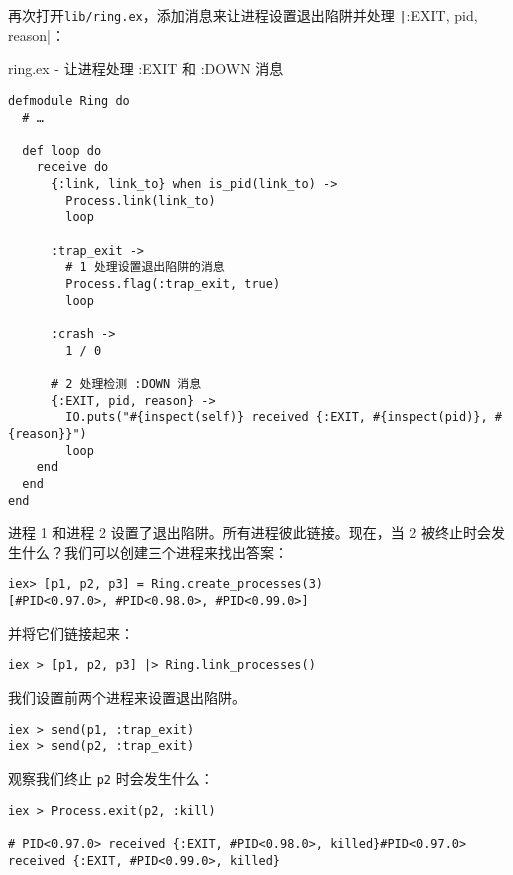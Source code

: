 再次打开\texttt{lib/ring.ex}，添加消息来让进程设置退出陷阱并处理
\texttt|{:EXIT, pid, reason}|：

\begin{code}{ring.ex - 让进程处理 :EXIT 和 :DOWN 消息}
\begin{verbatim}
defmodule Ring do
  # …

  def loop do
    receive do
      {:link, link_to} when is_pid(link_to) ->
        Process.link(link_to)
        loop

      :trap_exit ->
        # 1 处理设置退出陷阱的消息
        Process.flag(:trap_exit, true)
        loop

      :crash ->
        1 / 0

      # 2 处理检测 :DOWN 消息
      {:EXIT, pid, reason} ->
        IO.puts("#{inspect(self)} received {:EXIT, #{inspect(pid)}, #{reason}}")
        loop
    end
  end
end
\end{verbatim}
\label{lst:trap_exit_and_handle_exit_messages}
\end{code}

进程 1 和进程 2 设置了退出陷阱。所有进程彼此链接。现在，当 2 被终止时会发生什么？我们可以创建三个进程来找出答案：

\begin{code}{}
\begin{verbatim}
iex> [p1, p2, p3] = Ring.create_processes(3)
[#PID<0.97.0>, #PID<0.98.0>, #PID<0.99.0>]
\end{verbatim}
\end{code}

并将它们链接起来：

\begin{code}{}
\begin{verbatim}
iex > [p1, p2, p3] |> Ring.link_processes()
\end{verbatim}
\end{code}

我们设置前两个进程来设置退出陷阱。

\begin{code}{}
\begin{verbatim}
iex > send(p1, :trap_exit)
iex > send(p2, :trap_exit)
\end{verbatim}
\end{code}

观察我们终止 \texttt{p2} 时会发生什么：

\begin{code}{}
\begin{verbatim}
iex > Process.exit(p2, :kill)

# PID<0.97.0> received {:EXIT, #PID<0.98.0>, killed}#PID<0.97.0> received {:EXIT, #PID<0.99.0>, killed}
\end{verbatim}
\end{code}

